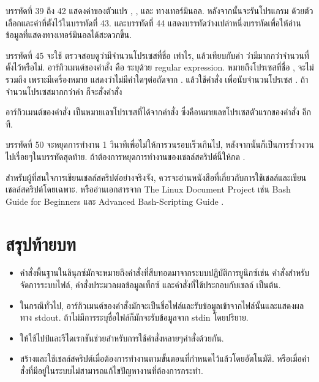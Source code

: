\begin{thwbr}
บรรทัดที่ 39 ถึง 42 แสดงค่าของตัวแปร , ,  และ  ทางเทอร์มินอล. หลังจากนั้นจะรันโปรแกรม  ด้วยตัวเลือกและค่าที่ตั้งไว้ในบรรทัดที่ 43. และบรรทัดที่ 44 แสดงบรรทัดว่างเปล่าหนึ่งบรรทัดเพื่อให้อ่านข้อมูลที่แสดงทางเทอร์มินอลได้สะดวกขึ้น.

บรรทัดที่ 45 จะใช้  ตรวจสอบดูว่ามีจำนวนโปรเซสที่ชื่อ  เท่าไร, แล้วเทียบกับค่า  ว่ามีมากกว่าจำนวนที่ตั้งไว้หรือไม่. อาร์กิวเมนต์ของคำสั่ง  คือ  ระบุด้วย regular expression. หมายถึงโปรเซสที่ชื่อ , จะไม่รวมถึง  เพราะมีเครื่องหมาย \cmd{\$} แสดงว่าไม่มีคำใดๆต่อถัดจาก . แล้วใช้คำสั่ง  เพื่อนับจำนวนโปรเซส . ถ้าจำนวนโปรเซสมากกว่าค่า  ก็จะสั่งคำสั่ง

\medskip
{}
\medskip

อาร์กิวเมนต์ของคำสั่ง  เป็นหมายเลขโปรเซสที่ได้จากคำสั่ง  ซึ่งคือหมายเลขโปรเซสตัวแรกของคำสั่ง  อีกที.

บรรทัดที่ 50 จะหยุดการทำงาน 1 วินาทีเพื่อไม่ให้การวนรอบเร็วเกินไป, หลังจากนั้นก็เป็นการซ้ำวงวน  ไปเรื่อยๆในบรรทัดสุดท้าย. ถ้าต้องการหยุดการทำงานของเชลล์สคริปต์นี้ให้กด .





\medskip
สำหรับผู้ที่สนใจการเขียนเชลล์สคริปต์อย่างจริงจัง, ควรจะอ่านหนังสือที่เกี่ยวกับการใช้เชลล์และเขียนเชลล์สคริปต์โดยเฉพาะ. หรืออ่านเอกสารจาก The Linux Document Project เช่น Bash Guide for Beginners \cite{bashguide} และ Advanced Bash-Scripting Guide \cite{abs}. 

\section{สรุปท้ายบท}
\begin{itemize}
\item คำสั่งพื้นฐานในลินุกซ์มักจะหมายถึงคำสั่งที่สืบทอดมาจากระบบปฏิบัติการยูนิกซ์เช่น คำสั่งสำหรับจัดการระบบไฟล์, คำสั่งประมวลผลข้อมูลเท็กซ์ และคำสั่งที่ใช้ประกอบกับเชลล์ เป็นต้น.
\item ในกรณีทั่วไป, อาร์กิวเมนต์ของคำสั่งมักจะเป็นชื่อไฟล์และรับข้อมูลเข้าจากไฟล์นั้นและแสดงผลทาง stdout. ถ้าไม่มีการระบุชื่อไฟล์ก็มักจะรับข้อมูลจาก stdin โดยปริยาย.
\item ให้ใช้ไปป์และรีไดเรกชันช่วยสำหรับการใช้คำสั่งหลายๆคำสั่งด้วยกัน.
\item สร้างและใช้เชลล์สคริปต์เมื่อต้องการทำงานตามขั้นตอนที่กำหนดไว้แล้วโดยอัตโนมัติ. หรือเมื่อคำสั่งที่มีอยู่ในระบบไม่สามารถแก้ไขปัญหางานที่ต้องการกระทำ.
\end{itemize}



\end{thwbr}
